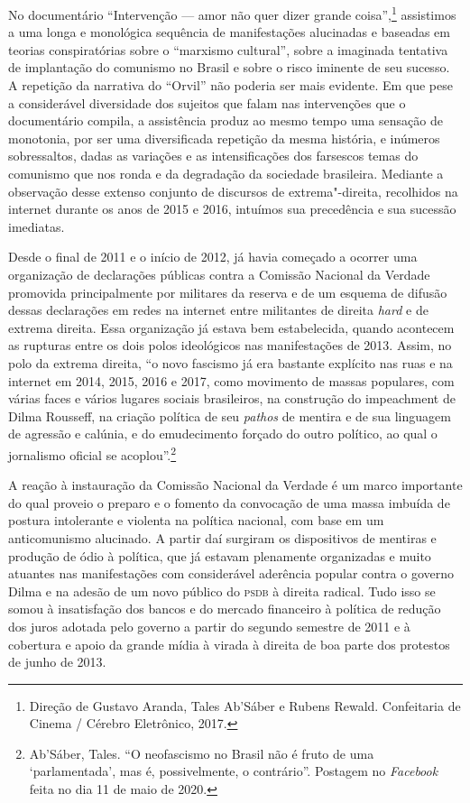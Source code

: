 No documentário ``Intervenção --- amor não quer dizer grande
coisa'',\footnote{Direção de Gustavo Aranda, Tales Ab'Sáber e Rubens
  Rewald. Confeitaria de Cinema / Cérebro Eletrônico, 2017.} assistimos
a uma longa e monológica sequência de manifestações alucinadas e
baseadas em teorias conspiratórias sobre o ``marxismo cultural'', sobre
a imaginada tentativa de implantação do comunismo no Brasil e sobre o
risco iminente de seu sucesso. A repetição da narrativa do ``Orvil'' não
poderia ser mais evidente. Em que pese a considerável diversidade dos
sujeitos que falam nas intervenções que o documentário compila, a
assistência produz ao mesmo tempo uma sensação de monotonia, por ser uma
diversificada repetição da mesma história, e inúmeros sobressaltos,
dadas as variações e as intensificações dos farsescos temas do comunismo
que nos ronda e da degradação da sociedade brasileira. Mediante a
observação desse extenso conjunto de discursos de extrema"-direita,
recolhidos na internet durante os anos de 2015 e 2016, intuímos sua
precedência e sua sucessão imediatas.

Desde o final de 2011 e o início de 2012, já havia começado a ocorrer
uma organização de declarações públicas contra a Comissão Nacional da
Verdade promovida principalmente por militares da reserva e de um
esquema de difusão dessas declarações em redes na internet entre
militantes de direita \emph{hard} e de extrema direita. Essa organização
já estava bem estabelecida, quando acontecem as rupturas entre os dois
polos ideológicos nas manifestações de 2013. Assim, no polo da extrema
direita, ``o novo fascismo já era bastante explícito nas ruas e na
internet em 2014, 2015, 2016 e 2017, como movimento de massas populares,
com várias faces e vários lugares sociais brasileiros, na construção do
impeachment de Dilma Rousseff, na criação política de seu \emph{pathos}
de mentira e de sua linguagem de agressão e calúnia, e do emudecimento
forçado do outro político, ao qual o jornalismo oficial se
acoplou''.\footnote{Ab'Sáber, Tales. ``O neofascismo no Brasil não é
  fruto de uma `parlamentada', mas é, possivelmente, o contrário''.
  Postagem no \emph{Facebook} feita no dia 11 de maio de 2020.}

A reação à instauração da Comissão Nacional da Verdade é um marco
importante do qual proveio o preparo e o fomento da convocação de uma
massa imbuída de postura intolerante e violenta na política nacional,
com base em um anticomunismo alucinado. A partir daí surgiram os
dispositivos de mentiras e produção de ódio à política, que já estavam
plenamente organizadas e muito atuantes nas manifestações com
considerável aderência popular contra o governo Dilma e na adesão de um
novo público do \textsc{psdb} à direita radical. Tudo isso se somou à
insatisfação dos bancos e do mercado financeiro à política de redução
dos juros adotada pelo governo a partir do segundo semestre de 2011 e à
cobertura e apoio da grande mídia à virada à direita de boa parte dos
protestos de junho de 2013.

